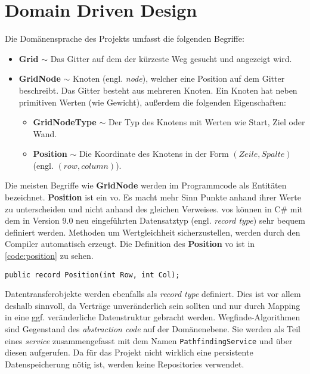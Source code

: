\part{Domain Driven Design}
Die Domänensprache des Projekts umfasst die folgenden Begriffe:
\begin{itemize}
      \item \textbf{Grid} $\sim$ Das Gitter auf dem der kürzeste Weg gesucht und
            angezeigt wird.
      \item \textbf{GridNode} $\sim$ Knoten (engl. \textit{node}),
            welcher eine Position auf dem Gitter beschreibt. Das
            Gitter besteht aus mehreren Knoten. Ein Knoten hat neben
            primitiven Werten (wie Gewicht), außerdem die
            folgenden Eigenschaften:
            \begin{itemize}[topsep=0pt]
                  \item \textbf{GridNodeType} $\sim$ Der Typ des Knotens mit Werten
                        wie Start, Ziel oder Wand.
                  \item \textbf{Position} $\sim$ Die Koordinate des Knotens in der
                        Form $(Zeile,Spalte)$ (engl. $(row,column)$).
            \end{itemize}
\end{itemize}
Die meisten Begriffe wie \textbf{GridNode} werden im Programmcode als Entitäten bezeichnet.
\textbf{Position} ist ein \ac{vo}. Es macht mehr Sinn Punkte anhand ihrer
Werte zu unterscheiden und nicht anhand des gleichen Verweises.
\acp{vo} können in C\# mit dem in Version 9.0 neu eingeführten
Datensatztyp (engl. \textit{record type}) sehr bequem definiert werden.
Methoden um Wertgleichheit sicherzustellen,
werden durch den Compiler automatisch erzeugt.
Die Definition des \textbf{Position} \ac{vo} ist in \autoref{code:position}
zu sehen.
\begin{lstlisting}[caption={Der Datensatztyp einer Koordinate},label={code:position}]
public record Position(int Row, int Col);
\end{lstlisting}
Datentransferobjekte werden ebenfalls als \textit{record type} definiert.
Dies ist vor allem deshalb sinnvoll, da Verträge unveränderlich sein sollten
und nur durch Mapping in eine ggf. veränderliche Datenstruktur gebracht werden.
Wegfinde-Algorithmen sind Gegenstand des \textit{abstraction code} auf
der Domänenebene. Sie werden als Teil eines \textit{service}
zusammengefasst mit dem Namen \texttt{Path\-findingService} und
über diesen aufgerufen. Da für das Projekt nicht wirklich
eine persistente Datenspeicherung nötig ist, werden keine
Repositories verwendet.